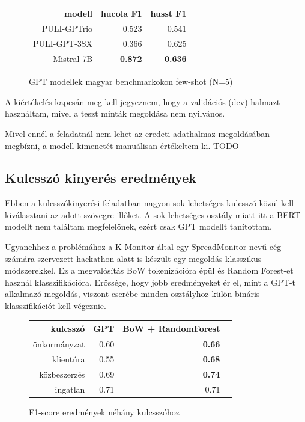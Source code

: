 \begin{figure}[H]
	\centering
	\begin{tabular}{rrrr}
		modell & hucola F1 & husst F1 \\ \hline
		PULI-GPTrio & 0.523 & 0.541 \\
		PULI-GPT-3SX & 0.366 & 0.625 \\
		Mistral-7B & \textbf{0.872} & \textbf{0.636} \\
	\end{tabular}
	\caption{GPT modellek magyar benchmarkokon few-shot (N=5)}
\end{figure}

A kiértékelés kapcsán meg kell jegyeznem, hogy a validációs (dev) halmazt használtam, mivel a teszt minták megoldása nem nyilvános.

Mivel ennél a feladatnál nem lehet az eredeti adathalmaz megoldásában megbízni, a modell kimenetét manuálisan értékeltem ki. TODO

\subsection{Kulcsszó kinyerés eredmények}

Ebben a kulcsszókinyerési feladatban nagyon sok lehetséges kulcsszó közül kell kiválasztani az adott szövegre illőket. A sok lehetséges osztály miatt itt a BERT modellt nem találtam megfelelőnek, ezért csak GPT modellt tanítottam.

Ugyanehhez a problémához a K-Monitor által egy SpreadMonitor nevű cég számára szervezett hackathon alatt is készült egy megoldás klasszikus módszerekkel. Ez a megvalósítás BoW tokenizációra épül és Random Forest-et használ klasszifikációra. Erőssége, hogy jobb eredményeket ér el, mint a GPT-t alkalmazó megoldás, viszont cserébe minden osztályhoz külön bináris klasszifikációt kell végeznie.

\begin{figure}[H]
	\centering
	\begin{tabular}{rrrr}
		kulcsszó & GPT & BoW + RandomForest \\ \hline
		önkormányzat & 0.60 & \textbf{0.66} \\
		klientúra & 0.55 & \textbf{0.68} \\
		közbeszerzés & 0.69 & \textbf{0.74} \\
		ingatlan & 0.71 & 0.71 \\
	\end{tabular}
	\caption{F1-score eredmények néhány kulcsszóhoz}
\end{figure}
